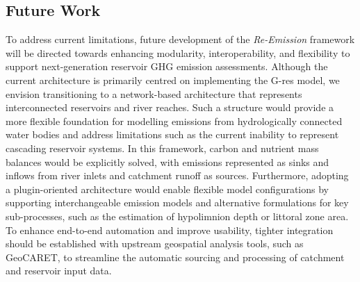 \documentclass[final,1p,times]{elsarticle}
\begin{document}

\subsection{Future Work}
\label{subsec:future_work}

To address current limitations, future development of the \emph{Re-Emission} framework will be directed towards enhancing modularity, interoperability, and flexibility to support next-generation reservoir \ac{GHG} emission assessments.
Although the current architecture is primarily centred on implementing the G-res model, we envision transitioning to a network-based architecture that represents interconnected reservoirs and river reaches. 
Such a structure would provide a more flexible foundation for modelling emissions from hydrologically connected water bodies and address limitations such as the current inability to represent cascading reservoir systems. 
In this framework, carbon and nutrient mass balances would be explicitly solved, with emissions represented as sinks and inflows from river inlets and catchment runoff as sources.
Furthermore, adopting a plugin-oriented architecture would enable flexible model configurations by supporting interchangeable emission models and alternative formulations for key sub-processes, such as the estimation of hypolimnion depth or littoral zone area. 
To enhance end-to-end automation and improve usability, tighter integration should be established with upstream geospatial analysis tools, such as GeoCARET, to streamline the automatic sourcing and processing of catchment and reservoir input data.
\end{document}
